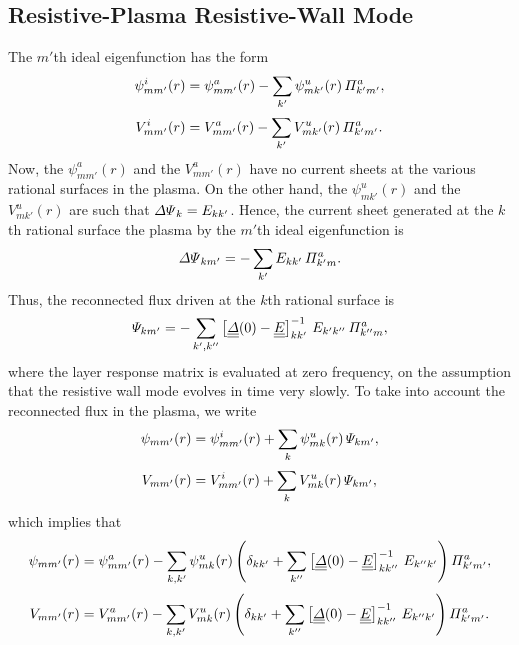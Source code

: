 \documentclass[12pt,prb,aps,notitlepage]{revtex4-1}
\begin{document}
\subsection{Resistive-Plasma Resistive-Wall Mode}
The $m'$th ideal eigenfunction has the form
\begin{align}
\psi^i_{mm'}(r) &= \psi^a_{mm'}(r) - \sum_{k'}\psi^u_{mk'}(r)\,{\mit\Pi}_{k'm'}^a,\\[0.5ex]
V^i_{mm'}(r) &=  V^a_{mm'}(r) - \sum_{k'} V^u_{mk'}(r)\,{\mit\Pi}_{k'm'}^a.
\end{align}
Now, the $\psi^a_{mm'}(r)$ and the $V^a_{mm'}(r)$ have no current sheets at the various rational surfaces in the plasma. 
On the other hand, the $\psi^u_{mk'}(r)$ and  the $V^u_{mk'}(r)$ are such that ${\mit\Delta\Psi}_{k}= E_{kk'}$. Hence, the current sheet generated at the $k$th rational surface the plasma by the $m'$th ideal eigenfunction is
\begin{equation}
{\mit\Delta\Psi}_{km'} = -\sum_{k'}E_{kk'}\,{\mit\Pi}_{k'm}^a.
\end{equation}
Thus, the reconnected flux driven at the $k$th rational surface is
\begin{equation}
{\mit\Psi}_{km'}= -\sum_{k',k''}\left[\underline{\underline{\mit\Delta}}(0)-\underline{\underline{E}}\right]^{-1}_{kk'}\,E_{k'k''}\,{\mit\Pi}_{k''m}^a,
\end{equation}
where the layer response matrix is evaluated at zero frequency, on the assumption that the resistive wall mode evolves in time very slowly. 
To take into account the reconnected flux in the plasma, we write
\begin{align}
\psi_{mm'}(r) &=\psi^i_{mm'}(r) + \sum_k \psi^u_{mk}(r)\,{\mit\Psi}_{km'},\\[0.5ex]
V_{mm'}(r) &=  V^i_{mm'}(r) + \sum_k V^u_{mk}(r)\,{\mit\Psi}_{km'},
\end{align}
which implies that
\begin{align}
\psi_{mm'}(r) &= \psi^a_{mm'}(r) - \sum_{k,k'}\psi^u_{mk}(r)\left(\delta_{kk'}+ \sum_{k''}\left[\underline{\underline{\mit\Delta}}(0)-\underline{\underline{E}}\right]^{-1}_{kk''}\,E_{k''k'}\right){\mit\Pi}_{k'm'}^a,\\[0.5ex]
V_{mm'}(r) &=  V^a_{mm'}(r) - \sum_{k,k'} V^u_{mk}(r)\left(\delta_{kk'}+ \sum_{k''}\left[\underline{\underline{\mit\Delta}}(0)-\underline{\underline{E}}\right]^{-1}_{kk''}\,E_{k''k'}\right){\mit\Pi}_{k'm'}^a.
\end{align}
\end{document}
